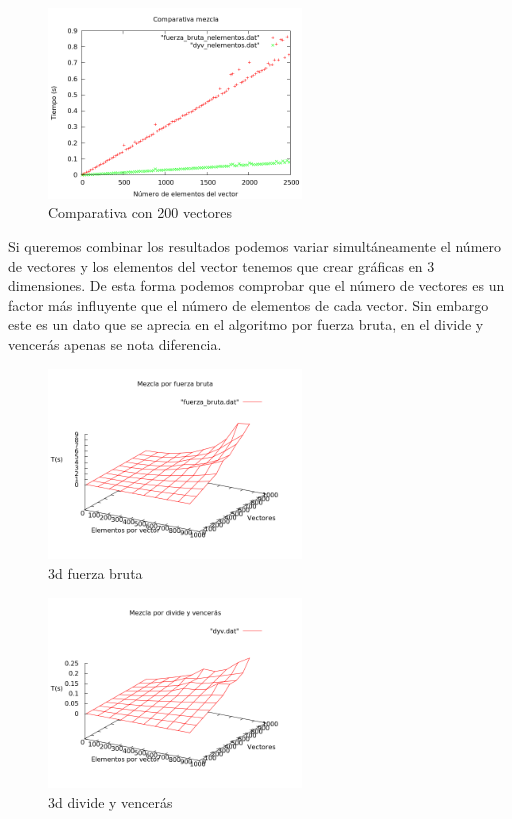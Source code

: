 \begin{figure}[htb] 
\centering
	\includegraphics[width=0.6\textwidth]{../Obligatorio/Graficas/comparativa_nelementos.png}
	\caption{Comparativa con 200 vectores} 
	\label{fig:comp_nelementos} 
\end{figure}

\newpage
Si queremos combinar los resultados podemos variar simult\'aneamente el n\'umero de vectores y los elementos del vector tenemos que crear gr\'aficas en $3$ dimensiones.
De esta forma podemos comprobar que el n\'umero de vectores es un factor m\'as influyente que el n\'umero de elementos de cada vector. Sin embargo este es un dato que se aprecia en el algoritmo por fuerza bruta, en el divide y vencer\'as apenas se nota diferencia.

\begin{figure}[htb] 
\centering
	\includegraphics[width=0.6\textwidth]{../Obligatorio/Graficas/3d_fuerza_bruta.png}
	\caption{3d fuerza bruta} 
	\label{fig:3d_f} 
\end{figure}

\begin{figure}[htb] 
\centering
	\includegraphics[width=0.6\textwidth]{../Obligatorio/Graficas/3d_dyv.png}
	\caption{3d divide y vencerás} 
	\label{fig:3d_d} 
\end{figure}

\newpage

{\ }

\newpage


